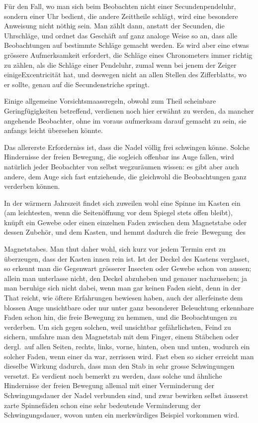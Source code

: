 Für den Fall, wo man sich beim Beobachten nicht einer Secundenpendeluhr, sondern einer Uhr bedient, die andere Zeittheile schlägt, wird eine besondere Anweisung nicht nöthig sein. Man zählt dann, anstatt der Secunden, die Uhrschläge, und ordnet das Geschäft auf ganz analoge Weise so an, dass alle Beobachtungen auf bestimmte Schläge gemacht werden. Es wird aber eine etwas grössere Aufmerksamkeit erfordert, die Schläge eines Chronometers immer richtig zu zählen, als die Schläge einer Pendeluhr, zumal wenn bei jenem der Zeiger einigeExcentricität hat, und deswegen nicht an allen Stellen des Zifferblatts, wo er sollte, genau auf die Secundenstriche springt.

Einige allgemeine Vorsichtsmaassregeln, obwohl zum Theil scheinbare Geringfügigkeiten betreffend, verdienen noch hier erwähnt zu werden, da mancher angehende Beobachter, ohne im voraus aufmerksam darauf gemacht zu sein, sie anfangs leicht übersehen könnte.

Das allererste Erforderniss ist, dass die Nadel völlig frei schwingen könne. Solche Hindernisse der freien Bewegung, die sogleich offenbar ins Auge fallen, wird natürlich jeder Beobachter von selbst wegzuräumen wissen: es gibt aber auch andere, dem Auge sich fast entziehende, die gleichwohl die Beobachtungen ganz verderben können.

In der wärmern Jahrszeit findet sich zuweilen wohl eine Spinne im Kasten ein (am leichtesten, wenn die Seitenöffnung vor dem Spiegel stets offen bleibt), knüpft ein Gewebe oder einen einzelnen Faden zwischen dem Magnetstabe oder dessen Zubehör, und dem Kasten, und hemmt dadurch die freie~Bewegung~des
\par\clearpage
{}
\noindent Magnetstabes. Man thut daher wohl, sich kurz vor jedem Termin erst zu überzeugen, dass der Kasten innen rein ist. Ist der Deckel des Kastens verglaset, so erkennt man die Gegenwart grösserer Insecten oder Gewebe schon von aussen; allein man unterlasse nicht, den Deckel abzuheben und genauer nachzusehen; ja man beruhige sich nicht dabei, wenn man gar keinen Faden sieht, denn in der That reicht, wie öftere Erfahrungen bewiesen haben, auch der allerfeinste dem blossen Auge unsichtbare oder nur unter ganz besonderer Beleuchtung erkennbare Faden schon hin, die freie Bewegung zu hemmen, und die Beobachtungen zu verderben. Um sich gegen solchen, weil unsichtbar gefährlichsten, Feind zu sichern, umfahre man den Magnetstab mit dem Finger, einem Stäbchen oder dergl.\ auf allen Seiten, rechts, links, vorne, hinten, oben und unten, wodurch ein solcher Faden, wenn einer da war, zerrissen wird. Fast eben so sicher erreicht man dieselbe Wirkung dadurch, dass man den Stab in sehr grosse Schwingungen versetzt. Es verdient noch bemerkt zu werden, dass solche und ähnliche Hindernisse der freien Bewegung allemal mit einer Verminderung der Schwingungsdauer der Nadel verbunden sind, und zwar bewirken selbst äusserst zarte Spinnefäden schon eine sehr bedeutende Verminderung der Schwingungsdauer, wovon unten ein merkwürdiges Beispiel vorkommen wird.

